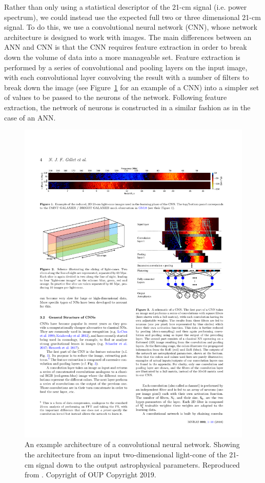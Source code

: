 Rather than only using a statistical descriptor of the 21-cm signal (i.e. power spectrum), we could instead use the expected full two or three dimensional 21-cm signal. To do this, we use a convolutional neural network (CNN), whose network architecture is designed to work with images. The main differences between an ANN and CNN is that the CNN requires feature extraction in order to break down the volume of data into a more manageable set. Feature extraction is performed by a series of convolutional and pooling layers on the input image, with each convolutional layer convolving the result with a number of filters to break down the image (see Figure~\ref{fig:CNN} for an example of a CNN) into a simpler set of values to be passed to the neurons of the network. Following feature extraction, the network of neurons is constructed in a similar fashion as in the case of an ANN.

\begin{figure}[]
\begin{center}
\includegraphics[trim = 0.2cm 1cm 0.2cm 0.2cm, scale = 1.05]{Greig/CNNexample}
\end{center}
\caption{An example architecture of a convolutional neural network. Showing the architecture from an input two-dimensional light-cone of the 21-cm signal down to the output astrophysical parameters. Reproduced from \cite{Gillet:2019}. Copyright of OUP Copyright 2019.}
\label{fig:CNN}
\end{figure}

